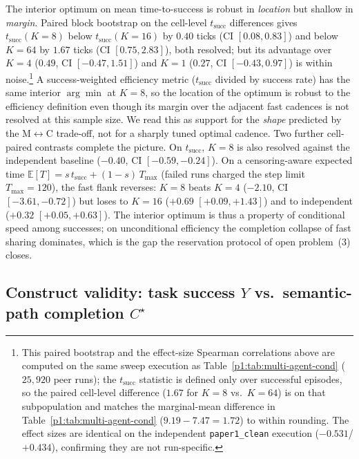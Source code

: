 \documentclass{article}
\begin{document}
The interior optimum on mean time-to-success is robust in \emph{location} but shallow in \emph{margin}. Paired block bootstrap on the cell-level $t_{\mathrm{succ}}$ differences gives $t_{\mathrm{succ}}(K{=}8)$ below $t_{\mathrm{succ}}(K{=}16)$ by $0.40$ ticks (CI $[0.08,0.83]$) and below $K{=}64$ by $1.67$ ticks (CI $[0.75,2.83]$), both resolved; but its advantage over $K{=}4$ ($0.49$, CI $[-0.47,1.51]$) and $K{=}1$ ($0.27$, CI $[-0.43,0.97]$) is within noise.\footnote{This paired bootstrap and the effect-size Spearman correlations above are computed on the same sweep execution as Table~\ref{p1:tab:multi-agent-cond} ($25{,}920$ peer runs); the $t_{\mathrm{succ}}$ statistic is defined only over successful episodes, so the paired cell-level difference ($1.67$ for $K{=}8$ vs.\ $K{=}64$) is on that subpopulation and matches the marginal-mean difference in Table~\ref{p1:tab:multi-agent-cond} ($9.19{-}7.47{=}1.72$) to within rounding. The effect sizes are identical on the independent \texttt{paper1\_clean} execution ($-0.531$/$+0.434$), confirming they are not run-specific.} A success-weighted efficiency metric ($t_{\mathrm{succ}}$ divided by success rate) has the same interior $\arg\min$ at $K{=}8$, so the location of the optimum is robust to the efficiency definition even though its margin over the adjacent fast cadences is not resolved at this sample size. We read this as support for the \emph{shape} predicted by the M$\leftrightarrow$C trade-off, not for a sharply tuned optimal cadence. Two further cell-paired contrasts complete the picture. On $t_{\mathrm{succ}}$, $K{=}8$ is also resolved against the independent baseline ($-0.40$, CI $[-0.59,-0.24]$). On a censoring-aware expected time $\mathbb{E}[T] = s\,t_{\mathrm{succ}} + (1-s)\,T_{\max}$ (failed runs charged the step limit $T_{\max}{=}120$), the fast flank reverses: $K{=}8$ beats $K{=}4$ ($-2.10$, CI $[-3.61,-0.72]$) but loses to $K{=}16$ ($+0.69$ $[+0.09,+1.43]$) and to independent ($+0.32$ $[+0.05,+0.63]$). The interior optimum is thus a property of conditional speed among successes; on unconditional efficiency the completion collapse of fast sharing dominates, which is the gap the reservation protocol of open problem~(3) closes.

\subsection{Construct validity: task success $Y$ vs.\ semantic-path completion $C^\star$}
\label{p1:app:y-vs-c}
\end{document}
